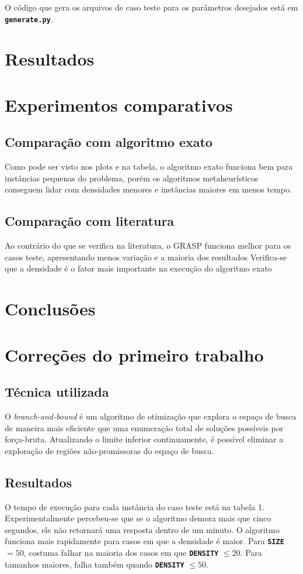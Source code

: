 \documentclass[12pt, a4paper]{article}
\newcommand{\ic}[1]{\textbf{\lstinline{#1}}}
\begin{document}
O código que gera os arquivos de caso teste para os parâmetros desejados está
em \ic{generate.py}.

\section{Resultados}
\section{Experimentos comparativos}
\subsection{Comparação com algoritmo exato}
Como pode ser visto nos plots e na tabela, o algoritmo exato funciona bem para
instâncias pequenas do problema, porém os algoritmos metaheurísticos conseguem
lidar com densidades menores e instâncias maiores em menos tempo.

\subsection{Comparação com literatura}
Ao contrário do que se verifica na literatura, o GRASP funciona melhor para os
casos teste, apresentando menos variação e a maioria dos resultados 
Verifica-se que a densidade é o fator mais importante na execução do algoritmo
exato

\section{Conclusões}

\section{Correções do primeiro trabalho}
\subsection{Técnica utilizada}
O \emph{branch-and-bound} é um algoritmo de otimização que explora o espaço de
busca de maneira mais eficiente que uma enumeração total de soluções possíveis
por força-bruta.  Atualizando o limite inferior continuamente, é possível
eliminar a exploração de regiões não-promissoras do espaço de busca.

\subsection{Resultados}
O tempo de execução para cada instância do caso teste está na tabela 1.
Experimentalmente percebeu-se que se o algoritmo demora mais que cinco
segundos, ele não retornará uma resposta dentro de um minuto. O algoritmo
funciona mais rapidamente para casos em que a densidade é maior. Para \ic{SIZE}
$ = 50 $, costuma falhar na maioria dos casos em que \ic{DENSITY} $ \leq 20 $.
Para tamanhos maiores, falha também quando \ic{DENSITY} $ \leq 50 $.
\end{document}
